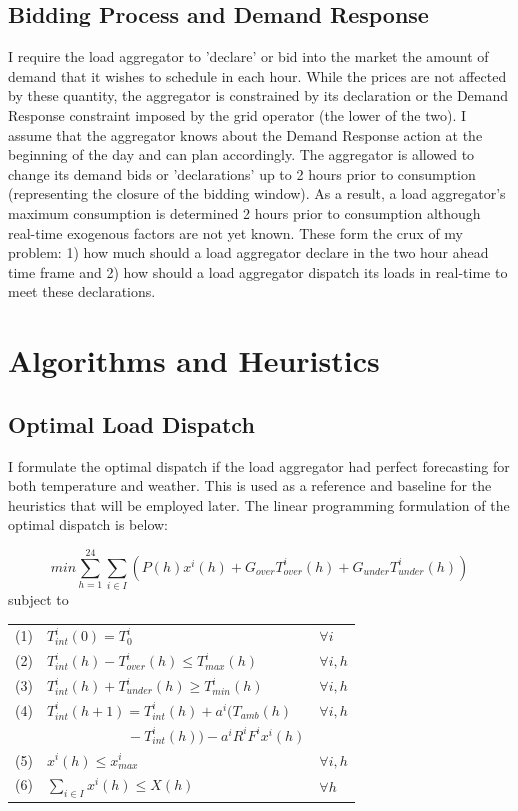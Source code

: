 \documentclass[journal]{IEEEtran}
\begin{document}
\subsection{Bidding Process and Demand Response}
I require the load aggregator to 'declare' or bid into the market the amount of demand that it wishes to schedule in each hour. While the prices are not affected by these quantity, the aggregator is constrained by its declaration or the Demand Response constraint imposed by the grid operator (the lower of the two). I assume that the aggregator knows about the Demand Response action at the beginning of the day and can plan accordingly. The aggregator is allowed to change its demand bids or 'declarations' up to 2 hours prior to consumption (representing the closure of the bidding window). As a result, a load aggregator's maximum consumption is determined 2 hours prior to consumption although real-time exogenous factors are not yet known. These form the crux of my problem: 1) how much should a load aggregator declare in the two hour ahead time frame and 2) how should a load aggregator dispatch its loads in real-time to meet these declarations.

\section{Algorithms and Heuristics}
\subsection{Optimal Load Dispatch}
I formulate the optimal dispatch if the load aggregator had perfect forecasting for both temperature and weather. This is used as a reference and baseline for the heuristics that will be employed later.
The linear programming formulation of the optimal dispatch is below:

\[ min \sum_{h=1}^{24}\sum_{i\in I} (P(h) x^i(h)+G_{over}T_{over}^i(h)+G_{under}T_{under}^i(h))\]
subject to

\begin{tabular}{ l l} 
(1)$\quad T_{int}^{i}(0)=T_0^i$ & $\forall{} i$ \\
(2)$\quad T_{int}^{i}(h)-T_{over}^{i}(h) \leq T_{max}^i(h)$ & $\forall{} i, h$\\
(3)$\quad T_{int}^{i}(h)+T_{under}^{i}(h) \geq T_{min}^i(h)$ & $\forall{} i, h$\\
(4)$\quad T_{int}^{i}(h+1)=T_{int}^{i}(h)+a^i(T_{amb}(h)$& $\forall{} i, h$\\
$\qquad \qquad \qquad \qquad -T_{int}^{i}(h))-a^iR^iF^ix^i(h)$&\\
(5)$\quad x^i(h) \leq x_{max}^i$& $\forall{} i, h$\\
(6)$\quad \sum_{i\in I}x^i(h) \leq X(h)$& $\forall{} h$\\

\end{tabular}
\end{document}
